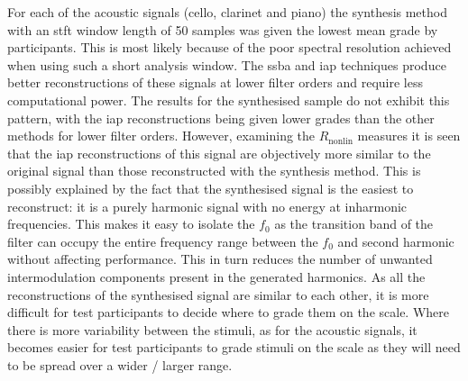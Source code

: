 		For each of the acoustic signals (cello, clarinet and piano) the synthesis method with an \acrshort{stft}
		window length of 50 samples was given the lowest mean grade by participants. This is most likely because of
		the poor spectral resolution achieved when using such a short analysis window. The \acrshort{ssba} and
		\acrshort{iap} techniques produce better reconstructions of these signals at lower filter orders and
		require less computational power. The results for the synthesised sample do not exhibit this pattern, with
		the \acrshort{iap} reconstructions being given lower grades than the other methods for lower filter orders.
		However, examining the $R_{\mathrm{nonlin}}$ measures it is seen that the \acrshort{iap} reconstructions of
		this signal are objectively more similar to the original signal than those reconstructed with the synthesis
		method. This is possibly explained by the fact that the synthesised signal is the easiest to reconstruct:
		it is a purely harmonic signal with no energy at inharmonic frequencies. This makes it easy to isolate the
		$f_{0}$ as the transition band of the filter can occupy the entire frequency range between the $f_{0}$ and
		second harmonic without affecting performance. This in turn reduces the number of unwanted intermodulation
		components present in the generated harmonics. As all the reconstructions of the synthesised signal are
		similar to each other, it is more difficult for test participants to decide where to grade them on the
		scale. Where there is more variability between the stimuli, as for the acoustic signals, it becomes easier
		for test participants to grade stimuli on the scale as they will need to be spread over a wider / larger
		range.

